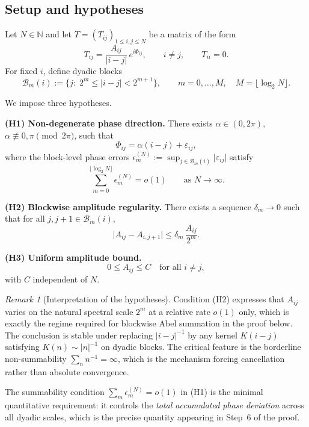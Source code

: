 \documentclass[12pt]{amsart}
\theoremstyle{definition}
\theoremstyle{remark}
\newtheorem{remark}[theorem]{Remark}
\newcommand{\abs}[1]{\lvert#1\rvert}
\newcommand{\Bm}{\mathcal{B}_m}
\begin{document}
\subsection{Setup and hypotheses}

Let $N\in\mathbb{N}$ and let $T=(T_{ij})_{1\leq i,j\leq N}$
be a matrix of the form
\[
  T_{ij} = \frac{A_{ij}}{\abs{i-j}}\,e^{i\Phi_{ij}},
  \qquad i\neq j,\qquad T_{ii}=0.
\]
For fixed $i$, define dyadic blocks
\[
  \mathcal{B}_m(i):=\{j:\;2^m\leq\abs{i-j}<2^{m+1}\},
  \qquad m=0,\dots,M,\quad M=\lfloor\log_2 N\rfloor.
\]

We impose three hypotheses.

\medskip\noindent
\textbf{(H1) Non-degenerate phase direction.}
There exists $\alpha\in(0,2\pi)$,
$\alpha\not\equiv 0,\pi\pmod{2\pi}$, such that
\[
  \Phi_{ij} = \alpha(i-j) + \varepsilon_{ij},
\]
where the block-level phase errors
$\epsilon_m^{(N)} := \sup_{j\in\mathcal{B}_m(i)}\abs{\varepsilon_{ij}}$
satisfy
\[
  \sum_{m=0}^{\lfloor\log_2 N\rfloor} \epsilon_m^{(N)}
  = o(1)
  \qquad\text{as } N\to\infty.
\]

\medskip\noindent
\textbf{(H2) Blockwise amplitude regularity.}
There exists a sequence $\delta_m\to 0$ such that
for all $j,j+1\in\Bm(i)$,
\[
  \abs{A_{ij}-A_{i,j+1}}
  \leq \delta_m\,\frac{A_{ij}}{2^m}.
\]

\medskip\noindent
\textbf{(H3) Uniform amplitude bound.}
\[
  0 \leq A_{ij} \leq C
  \quad\text{for all } i\neq j,
\]
with $C$ independent of $N$.

\begin{remark}[Interpretation of the hypotheses]
Condition (H2) expresses that $A_{ij}$ varies on the
natural spectral scale $2^m$ at a relative rate $o(1)$
only, which is exactly the regime required for blockwise
Abel summation in the proof below.
The conclusion is stable under replacing $\abs{i-j}^{-1}$
by any kernel $K(i-j)$ satisfying $K(n)\sim\abs{n}^{-1}$
on dyadic blocks.
The critical feature is the borderline non-summability
$\sum_n n^{-1} = \infty$,
which is the mechanism forcing cancellation rather than
absolute convergence.

\medskip\noindent
The summability condition $\sum_m\epsilon_m^{(N)}=o(1)$
in (H1) is the minimal quantitative requirement: it controls
the \emph{total accumulated phase deviation} across all
dyadic scales, which is the precise quantity appearing
in Step~6 of the proof.
\end{remark}
\end{document}
